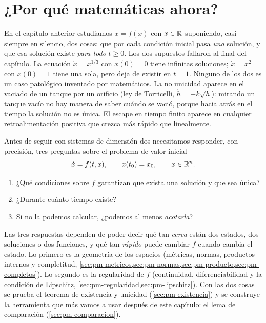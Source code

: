 \section{¿Por qué matemáticas ahora?}
\label{sec:pm-porque}

En el capítulo anterior estudiamos $\dot x=f(x)$ con $x\in\mathbb{R}$ suponiendo, casi siempre en silencio, dos cosas: que por cada condición inicial pasa \emph{una} solución, y que esa solución existe \emph{para todo} $t\ge0$. Los dos supuestos fallaron al final del capítulo. La ecuación $\dot x=x^{1/3}$ con $x(0)=0$ tiene infinitas soluciones; $\dot x=x^2$ con $x(0)=1$ tiene una sola, pero deja de existir en $t=1$. Ninguno de los dos es un caso patológico inventado por matemáticos. La no unicidad aparece en el vaciado de un tanque por un orificio (ley de Torricelli, $\dot h=-k\sqrt h$): mirando un tanque vacío no hay manera de saber cuándo se vació, porque hacia atrás en el tiempo la solución no es única. El escape en tiempo finito aparece en cualquier retroalimentación positiva que crezca más rápido que linealmente.

Antes de seguir con sistemas de dimensión dos necesitamos responder, con precisión, tres preguntas sobre el problema de valor inicial
\begin{equation}
  \dot x=f(t,x),\qquad x(t_0)=x_0,\qquad x\in\mathbb{R}^n .
  \label{eq:pm-pvi}
\end{equation}
\begin{enumerate}
  \item ¿Qué condiciones sobre $f$ garantizan que exista una solución y que sea única?
  \item ¿Durante cuánto tiempo existe?
  \item Si no la podemos calcular, ¿podemos al menos \emph{acotarla}?
\end{enumerate}

Las tres respuestas dependen de poder decir qué tan \emph{cerca} están dos estados, dos soluciones o dos funciones, y qué tan \emph{rápido} puede cambiar $f$ cuando cambia el estado. Lo primero es la geometría de los espacios (métricas, normas, productos internos y completitud, \cref{sec:pm-metricos,sec:pm-normas,sec:pm-producto,sec:pm-completos}). Lo segundo es la regularidad de $f$ (continuidad, diferenciabilidad y la condición de Lipschitz, \cref{sec:pm-regularidad,sec:pm-lipschitz}). Con las dos cosas se prueba el teorema de existencia y unicidad (\cref{sec:pm-existencia}) y se construye la herramienta que más vamos a usar después de este capítulo: el lema de comparación (\cref{sec:pm-comparacion}).

